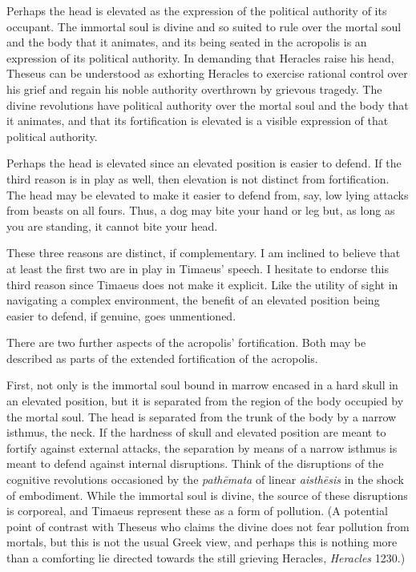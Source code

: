 Perhaps the head is elevated as the expression of the political authority of its occupant. The immortal soul is divine and so suited to rule over the mortal soul and the body that it animates, and its being seated in the acropolis is an expression of its political authority. In demanding that Heracles raise his head, Theseus can be understood as exhorting Heracles to exercise rational control over his grief and regain his noble authority overthrown by grievous tragedy. The divine revolutions have political authority over the mortal soul and the body that it animates, and that its fortification is elevated is a visible expression of that political authority. 

Perhaps the head is elevated since an elevated position is easier to defend. If the third reason is in play as well, then elevation is not distinct from fortification. The head may be elevated to make it easier to defend from, say, low lying attacks from beasts on all fours. Thus, a dog may bite your hand or leg but, as long as you are standing, it cannot bite your head.

These three reasons are distinct, if complementary. I am inclined to believe that at least the first two are in play in Timaeus' speech.  I hesitate to endorse this third reason since Timaeus does not make it explicit. Like the utility of sight in navigating a complex environment, the benefit of an elevated position being easier to defend, if genuine, goes unmentioned.

There are two further aspects of the acropolis' fortification. Both may be described as parts of the extended fortification of the acropolis.

First, not only is the immortal soul bound in marrow encased in a hard skull in an elevated position, but it is separated from the region of the body occupied by the mortal soul. The head is separated from the trunk of the body by a narrow isthmus, the neck. If the hardness of skull and elevated position are meant to fortify against external attacks, the separation by means of a narrow isthmus is meant to defend against internal disruptions. Think of the disruptions of the cognitive revolutions occasioned by the \emph{pathēmata} of linear \emph{aisthēsis} in the shock of embodiment. While the immortal soul is divine, the source of these disruptions is corporeal, and Timaeus represent these as a form of pollution. (A potential point of contrast with Theseus who claims the divine does not fear pollution from mortals, but this is not the usual Greek view, and perhaps this is nothing more than a comforting lie directed towards the still grieving Heracles, \emph{Heracles} 1230.)

